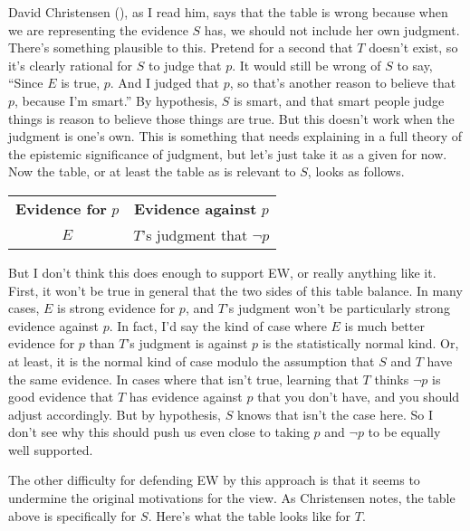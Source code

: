 \documentclass[
  11pt,
  letterpaper,
  DIV=11,
  numbers=noendperiod,
  oneside]{scrartcl}
\begin{document}
David Christensen (), as I
read him, says that the table is wrong because when we are representing
the evidence \(S\) has, we should not include her own judgment. There's
something plausible to this. Pretend for a second that \(T\) doesn't
exist, so it's clearly rational for \(S\) to judge that \(p\). It would
still be wrong of \(S\) to say, ``Since \(E\) is true, \(p\). And I
judged that \(p\), so that's another reason to believe that \(p\),
because I'm smart.'' By hypothesis, \(S\) is smart, and that smart
people judge things is reason to believe those things are true. But this
doesn't work when the judgment is one's own. This is something that
needs explaining in a full theory of the epistemic significance of
judgment, but let's just take it as a given for now.
Now the table, or at least the table as is relevant to \(S\), looks as
follows.

\begin{longtable}[]{@{}cc@{}}
\toprule\noalign{}
\endhead
\bottomrule\noalign{}
\endlastfoot
\textbf{Evidence for} \(p\) & \textbf{Evidence against} \(p\) \\
\(E\) & \(T\)'s judgment that \(\neg p\) \\
\end{longtable}

But I don't think this does enough to support EW, or really anything
like it. First, it won't be true in general that the two sides of this
table balance. In many cases, \(E\) is strong evidence for \(p\), and
\(T\)'s judgment won't be particularly strong evidence against \(p\). In
fact, I'd say the kind of case where \(E\) is much better evidence for
\(p\) than \(T\)'s judgment is against \(p\) is the statistically normal
kind. Or, at least, it is the normal kind of case modulo the assumption
that \(S\) and \(T\) have the same evidence. In cases where that isn't
true, learning that \(T\) thinks \(\neg p\) is good evidence that \(T\)
has evidence against \(p\) that you don't have, and you should adjust
accordingly. But by hypothesis, \(S\) knows that isn't the case here. So
I don't see why this should push us even close to taking \(p\) and
\(\neg p\) to be equally well supported.

The other difficulty for defending EW by this approach is that it seems
to undermine the original motivations for the view. As Christensen
notes, the table above is specifically for \(S\). Here's what the table
looks like for \(T\).
\end{document}

